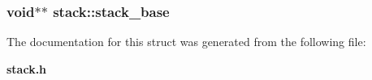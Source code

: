 \subsubsection{\setlength{\rightskip}{0pt plus 5cm}void$\ast$$\ast$ \bf{stack::stack\_\-base}}\label{structstack_4a244e87f004cb99dddb3abab82850e2}




The documentation for this struct was generated from the following file:\begin{CompactItemize}
\item 
\bf{stack.h}\end{CompactItemize}
